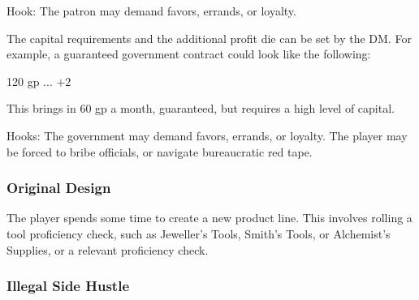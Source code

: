 \documentclass[twocolumn]{dndbook}
\begin{document}



Hook: The patron may demand favors, errands, or loyalty.\par

The capital requirements and the additional profit die can be set by the DM.
For example, a guaranteed government contract could look like the following:

\begin{DndComment}[color=bgtan2018]{}
	\hfill 120 gp
	\hfill ...
	\hfill $+2$
\end{DndComment}


This brings in 60 gp a month, guaranteed, but requires a high level of capital.

Hooks: The government may demand favors, errands, or loyalty.
The player may be forced to bribe officials, or navigate bureaucratic red tape.\par

\subsubsection{Original Design}


The player spends some time to create a new product line.
This involves rolling a tool proficiency check, such as Jeweller's Tools, Smith's Tools, or
Alchemist's Supplies, or a relevant proficiency check.


\subsubsection{Illegal Side Hustle}
\end{document}
